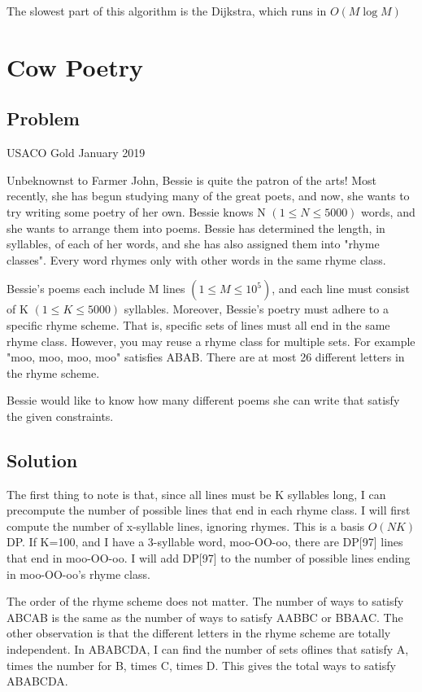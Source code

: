 \documentclass{article}
\begin{document}
The slowest part of this algorithm is the Dijkstra, which runs in $O(M\log M)$

\section{Cow Poetry}
\subsection{Problem}
USACO Gold January 2019

Unbeknownst to Farmer John, Bessie is quite the patron of the arts! Most recently, she has begun studying many of the great poets, and now, she wants to try writing some poetry of her own.
Bessie knows N $(1\leq N\leq 5000)$ words, and she wants to arrange them into poems. Bessie has determined the length, in syllables, of each of her words, and she has also assigned them into "rhyme classes". Every word rhymes only with other words in the same rhyme class.

Bessie's poems each include M lines $(1\leq M\leq 10^5)$, and each line must consist of K $(1\leq K\leq5000)$ syllables. Moreover, Bessie's poetry must adhere to a specific rhyme scheme. That is, specific sets of lines must all end in the same rhyme class. However, you may reuse a rhyme class for multiple sets. For example "moo, moo, moo, moo" satisfies ABAB. There are at most 26 different letters in the rhyme scheme.

Bessie would like to know how many different poems she can write that satisfy the given constraints.
\subsection{Solution}
The first thing to note is that, since all lines must be K syllables long, I can precompute the number of possible lines that end in each rhyme class. I will first compute the number of x-syllable lines, ignoring rhymes. This is a basis $O(NK)$ DP. If K=100, and I have a 3-syllable word, moo-OO-oo, there are DP[97] lines that end in moo-OO-oo. I will add DP[97] to the number of possible lines ending in moo-OO-oo's rhyme class.

The order of the rhyme scheme does not matter. The number of ways to satisfy ABCAB is the same as the number of ways to satisfy AABBC or BBAAC. The other observation is that the different letters in the rhyme scheme are totally independent. In ABABCDA, I can find the number of sets oflines that satisfy A, times the number for B, times C, times D. This gives the total ways to satisfy ABABCDA. 
\end{document}

